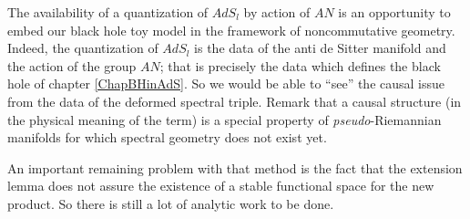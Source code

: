 The availability of a quantization of $AdS_l$ by action of $AN$ is an opportunity to embed our black hole toy model in the framework of noncommutative geometry. Indeed, the quantization of $AdS_l$ is the data of the anti de Sitter manifold and the action of the group $AN$; that is precisely the data which defines the black hole of chapter \ref{ChapBHinAdS}. So we would be able to ``see'' the causal issue from the data of the deformed spectral triple. Remark that a causal structure (in the physical meaning of the term) is a special property of \emph{pseudo}-Riemannian manifolds for which spectral geometry does not exist yet.

An important remaining problem with that method is the fact that the extension lemma does not assure the existence of a stable functional space for the new product. So there is still a lot of analytic work to be done.

